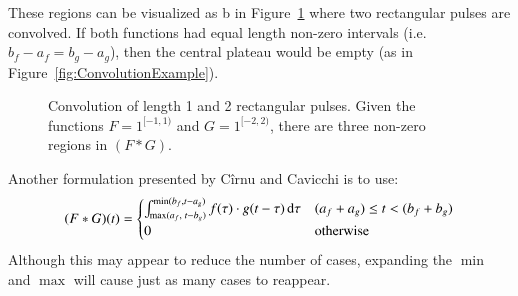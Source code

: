 These regions can be visualized as b in Figure~\ref{fig:OnePiece} where two rectangular pulses are convolved. 
If both functions had equal length non-zero intervals (i.e. $b_f-a_f = b_g-a_g$), then the central plateau would be empty
(as in Figure~\ref{fig:ConvolutionExample}).

\begin{figure}[ht] 
	\centering 
	\caption[Convolution of ``one-piece'' functions] {
		Convolution of length 1 and 2 rectangular pulses. 
		Given the functions $F=1^{[-1,1)}$ and $G=1^{[-2,2)}$, there are three non-zero regions in $(F*G)$.
	\label{fig:OnePiece}}
\end{figure}

\pagebreak

Another formulation presented by C\^{i}rnu \cite{cirnu2012calculation} and Cavicchi \cite{cavicchi2002simplified} is to use:
\begin{equation}
	\label{eqn:ConvCirnu}
	(F*G)(t)=
	\begin{cases}
		\int_{\max(a_f, \; t-b_g)}^{\min(b_f, t-a_g)} f(\tau)\cdot g(t-\tau)\mathop{}\!\mathrm{d}\tau & (a_f+a_g) \leq t < (b_f+b_g) \\
		0 & \text{otherwise}
	\end{cases}
\end{equation}
Although this may appear to reduce the number of cases, expanding the $\min$ and $\max$ will cause just as many 
cases to reappear.


